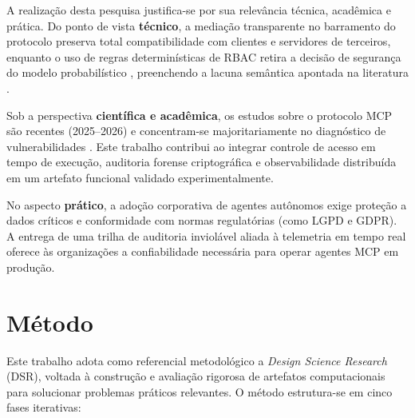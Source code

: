 A realização desta pesquisa justifica-se por sua relevância técnica, acadêmica e prática. Do ponto de vista \textbf{técnico}, a mediação transparente no barramento do protocolo preserva total compatibilidade com clientes e servidores de terceiros, enquanto o uso de regras determinísticas de RBAC retira a decisão de segurança do modelo probabilístico \cite{zhang2025acfix}, preenchendo a lacuna semântica apontada na literatura \cite{buhler2026agentbound}.

Sob a perspectiva \textbf{científica e acadêmica}, os estudos sobre o protocolo MCP são recentes (2025--2026) e concentram-se majoritariamente no diagnóstico de vulnerabilidades \cite{hasan2026mcp,guo2025measurement,hou2025mcp}. Este trabalho contribui ao integrar controle de acesso em tempo de execução, auditoria forense criptográfica e observabilidade distribuída em um artefato funcional validado experimentalmente.

No aspecto \textbf{prático}, a adoção corporativa de agentes autônomos exige proteção a dados críticos e conformidade com normas regulatórias (como LGPD e GDPR). A entrega de uma trilha de auditoria inviolável aliada à telemetria em tempo real oferece às organizações a confiabilidade necessária para operar agentes MCP em produção.

\section{Método}
\label{sec:metodologia}

Este trabalho adota como referencial metodológico a \textit{Design Science Research} (DSR), voltada à construção e avaliação rigorosa de artefatos computacionais para solucionar problemas práticos relevantes. O método estrutura-se em cinco fases iterativas:


